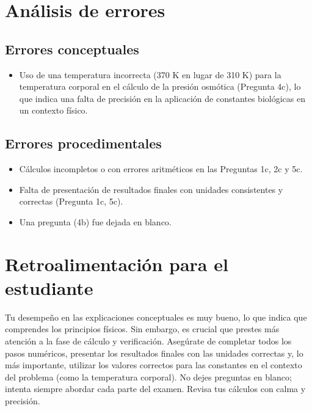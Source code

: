 \documentclass[11pt,a4paper]{article}
\begin{document}
\section*{Análisis de errores}

\subsection*{Errores conceptuales}
\begin{itemize}[leftmargin=1.5em, itemsep=2pt]
  \item Uso de una temperatura incorrecta (370 K en lugar de 310 K) para la temperatura corporal en el cálculo de la presión osmótica (Pregunta 4c), lo que indica una falta de precisión en la aplicación de constantes biológicas en un contexto físico.
\end{itemize}

\subsection*{Errores procedimentales}
\begin{itemize}[leftmargin=1.5em, itemsep=2pt]
  \item Cálculos incompletos o con errores aritméticos en las Preguntas 1c, 2c y 5c.
  \item Falta de presentación de resultados finales con unidades consistentes y correctas (Pregunta 1c, 5c).
  \item Una pregunta (4b) fue dejada en blanco.
\end{itemize}

\section*{Retroalimentación para el estudiante}
\begin{tcolorbox}[cajaRecomendacion, title={Dirigido a: Glanyernys Perez}]
Tu desempeño en las explicaciones conceptuales es muy bueno, lo que indica que comprendes los principios físicos. Sin embargo, es crucial que prestes más atención a la fase de cálculo y verificación. Asegúrate de completar todos los pasos numéricos, presentar los resultados finales con las unidades correctas y, lo más importante, utilizar los valores correctos para las constantes en el contexto del problema (como la temperatura corporal). No dejes preguntas en blanco; intenta siempre abordar cada parte del examen. Revisa tus cálculos con calma y precisión.
\end{tcolorbox}
\end{document}
